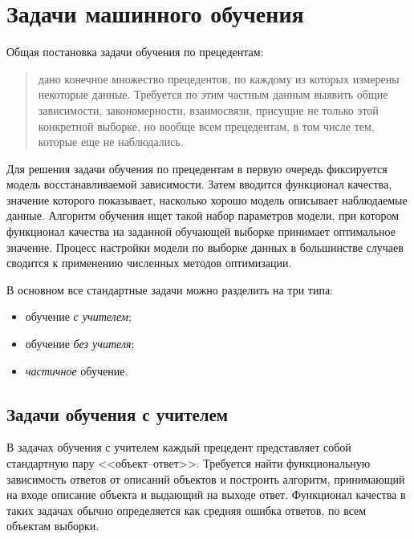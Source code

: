 \chapter{Задачи машинного обучения}
Общая постановка задачи обучения по прецедентам:
\begin{quotation}
\vspace*{-1ex}
дано конечное множество прецедентов, по каждому из которых измерены некоторые данные. Требуется по этим
частным данным выявить общие зависимости, закономерности, взаимосвязи, присущие не только этой
конкретной выборке, но вообще всем прецедентам, в том числе тем, которые еще не наблюдались.
\end{quotation}

Для решения задачи обучения по прецедентам в первую очередь фиксируется модель восстанавливаемой
зависимости. Затем вводится функционал качества, значение которого показывает, насколько хорошо модель
описывает наблюдаемые данные. Алгоритм обучения ищет такой набор параметров модели, при котором
функционал качества на заданной обучающей выборке принимает оптимальное значение. Процесс настройки
модели по выборке данных в большинстве случаев сводится к применению численных методов оптимизации.

В основном все стандартные задачи можно разделить на три типа:
\begin{itemize}
  \vspace*{-1ex}
  \itemsep -5pt
  \item обучение \emph{с учителем};
  \item обучение \emph{без учителя};
  \item \emph{частичное} обучение.
\end{itemize}

\section{Задачи обучения с учителем}
В задачах обучения с учителем каждый прецедент представляет собой стандартную пару <<объект--ответ>>.
Требуется найти функциональную зависимость ответов от описаний объектов и построить алгоритм,
принимающий на входе описание объекта и выдающий на выходе ответ. Функционал качества в таких задачах
обычно определяется как средняя ошибка ответов, по всем объектам выборки.


